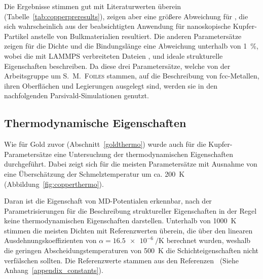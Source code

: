 \begin{table}[b!]
\begin{threeparttable}
  \end{threeparttable}
\end{table}

Die Ergebnisse stimmen gut mit Literaturwerten überein (Tabelle~\ref{tab:copperpreresults}), zeigen aber eine größere Abweichung für , die sich wahrscheinlich aus der beabsichtigten Anwendung für nanoskopische Kupfer-Partikel anstelle von Bulkmaterialien resultiert.
Die anderen Parametersätze zeigen für die Dichte und die Bindungslänge eine Abweichung unterhalb von \SI{1}{\percent}, wobei die mit LAMMPS verbreiteten Dateien ,  und  ideale strukturelle Eigenschaften beschreiben.
Da diese drei Parametersätze, welche von der Arbeitsgruppe um \textsc{S.~M.~Foiles}\cite{foiles_calculation_1985,foiles_embedded-atom-method_1986,adams_self-diffusion_1989} stammen, auf die Beschreibung von fcc-Metallen, ihren Oberflächen und Legierungen ausgelegt sind, werden sie in den nachfolgenden Parsivald-Simulationen genutzt.

\subsection{Thermodynamische Eigenschaften}

Wie für Gold zuvor (Abschnitt~\ref{goldthermo}) wurde auch für die Kupfer-Parametersätze eine Untersuchung der thermodynamischen Eigenschaften durchgeführt.
Dabei zeigt sich für die meisten Parametersätze mit Ausnahme von  eine Überschätzung der Schmelztemperatur um ca. \SI{200}{\kelvin} (Abbildung~\ref{fig:copperthermo}).

Daran ist die Eigenschaft von MD-Potentialen erkennbar, nach der Parametrisierungen für die Beschreibung struktureller Eigenschaften in der Regel keine thermodynamischen Eigenschaften darstellen.
Unterhalb von \SI{1000}{\kelvin} stimmen die meisten Dichten mit Referenzwerten überein, die über den linearen Ausdehnungskoeffizienten von $\alpha = \SI{16.5e-6}{\per\kelvin}$\cite{haynes_crc_2011} berechnet wurden, weshalb die geringen Abscheidungstemperaturen von \SI{500}{\kelvin} die Schichteigenschaften nicht verfälschen sollten.
Die Referenzwerte stammen aus den Referenzen~\cite{haynes_crc_2011,brillo_density_2006} (Siehe Anhang~\ref{appendix_constants}).

